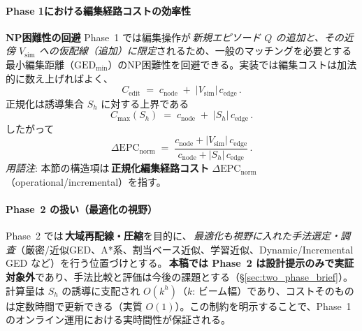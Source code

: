 \documentclass[ja=standard,xelatex]{bxjsarticle}
\begin{document}
\paragraph{Phase 1における編集経路コストの効率性}
\textbf{NP困難性の回避}\; Phase~1 では編集操作が\,\emph{新規エピソード $Q$ の追加と、その近傍 $V_{\mathrm{sim}}$ への仮配線（追加）に限定}されるため、一般のマッチングを必要とする最小編集距離（$\mathrm{GED}_{\min}$）のNP困難性を回避できる。実装では編集コストは加法的に数え上げればよく、
\begin{equation}
  C_{\mathrm{edit}}\;=\;c_{\mathrm{node}}\; +\; |V_{\mathrm{sim}}|\,c_{\mathrm{edge}}\,.
\end{equation}
正規化は誘導集合 $S_h$ に対する上界である
\begin{equation}
  C_{\max}(S_h)\;=\;c_{\mathrm{node}}\; +\; |S_h|\,c_{\mathrm{edge}}\,.
\end{equation}
したがって
\begin{equation}
  \Delta\mathrm{EPC}_{\mathrm{norm}}\;=\;\dfrac{c_{\mathrm{node}}+|V_{\mathrm{sim}}|\,c_{\mathrm{edge}}}{c_{\mathrm{node}}+|S_h|\,c_{\mathrm{edge}}}\,.
\end{equation}
\noindent\textit{用語注}: 本節の構造項は\,\textbf{正規化編集経路コスト} $\Delta\mathrm{EPC}_{\mathrm{norm}}$（operational/incremental）を指す。

\paragraph{Phase~2 の扱い（最適化の視野）}
Phase~2 では\,\textbf{大域再配線・圧縮}を目的に、\,\emph{最適化も視野に入れた手法選定・調査}（厳密/近似GED、A*系、割当ベース近似、学習近似、Dynamic/Incremental GED など）を行う位置づけとする。\,\textbf{本稿では Phase~2 は設計提示のみで実証対象外}であり、手法比較と評価は今後の課題とする（\S\ref{sec:two_phase_brief}）。
計算量は $S_h$ の誘導に支配され $O(k^h)$（$k$: ビーム幅）であり、コストそのものは定数時間で更新できる（実質 $O(1)$）。この制約を明示することで、Phase~1 のオンライン運用における実時間性が保証される。
\end{document}
